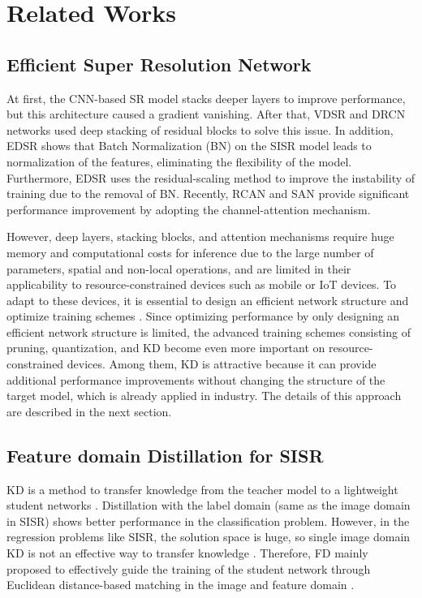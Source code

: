 \documentclass[10pt,twocolumn,letterpaper]{article}
\begin{document}
\section{Related Works}

\subsection{Efficient Super Resolution Network}
At first, the CNN-based SR model stacks deeper layers to improve performance, but this architecture caused a gradient vanishing. After that, VDSR \cite{vdsr} and DRCN \cite{drcn} networks used deep stacking of residual blocks \cite{rb} to solve this issue. In addition, EDSR \cite{edsr2} shows that Batch Normalization (BN) on the SISR model leads to normalization of the features, eliminating the flexibility of the model. Furthermore, EDSR uses the residual-scaling method to improve the instability of training due to the removal of BN. Recently, RCAN \cite{RCAN} and SAN \cite{san} provide significant performance improvement by adopting the channel-attention mechanism. 

However, deep layers, stacking blocks, and attention mechanisms require huge memory and computational costs for inference due to the large number of parameters, spatial and non-local operations, and are limited in their applicability to resource-constrained devices such as mobile or IoT devices. To adapt to these devices, it is essential to design an efficient network structure and optimize training schemes \cite{han}. Since optimizing performance by only designing an efficient network structure is limited, the advanced training schemes consisting of pruning, quantization, and KD become even more important on resource-constrained devices. Among them, KD is attractive because it can provide additional performance improvements without changing the structure of the target model, which is already applied in industry. The details of this approach are described in the next section.

\subsection{Feature domain Distillation for SISR}
KD is a method to transfer knowledge from the teacher model to a lightweight student networks \cite{kd}. Distillation with the label domain (same as the image domain in SISR) shows better performance in the classification problem. However, in the regression problems like SISR, the solution space is huge, so single image domain KD is not an effective way to transfer knowledge \cite{regress}. Therefore, FD mainly proposed to effectively guide the training of the student network through Euclidean distance-based matching in the image and feature domain \cite{fakd, lee, lsfd, fitnet}. 
\end{document}
